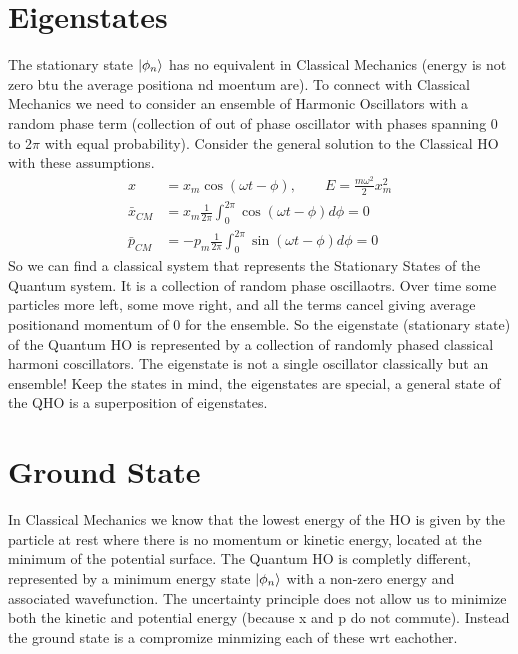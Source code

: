 \documentclass{article}
\newcommand{\be}{\begin{equation}}
\newcommand{\ee}{\end{equation}}
\begin{document}
\section*{Eigenstates}
The stationary state $\ket{\phi_n}$ has no equivalent in Classical Mechanics (energy is not zero btu the average positiona nd moentum are). 
To connect with Classical Mechanics we need to consider an ensemble of Harmonic Oscillators with a random phase term (collection of out of phase oscillator with phases spanning 0 to 2$\pi$ with equal  probability).
Consider the general solution to the Classical HO with these assumptions. 
\be
\begin{split}
    x &= x_m \cos(\omega t - \phi), \qquad E = \frac{m\omega^2}{2}x_m^2\\
    \bar{x}_{CM} &= x_m\frac{1}{2\pi}\int_0^{2\pi} \cos(\omega t - \phi) d\phi = 0\\
    \bar{p}_{CM} &= -p_m\frac{1}{2\pi}\int_0^{2\pi} \sin(\omega t - \phi) d\phi = 0
\end{split}
\ee
So we can find a classical system that represents the Stationary States of the Quantum system.
It is a collection of random phase oscillaotrs.
Over time some particles more left, some move right, and all the terms cancel giving average positionand momentum of 0 for the ensemble. 
So the eigenstate (stationary state) of the Quantum HO is represented by a collection of randomly phased classical harmoni coscillators. 
The eigenstate is not a single oscillator classically but an ensemble!
Keep the states in mind, the eigenstates are special, a general state of the QHO is a superposition of eigenstates.

\section*{Ground State}
In Classical Mechanics we know  that the lowest energy of the HO is given by the particle at rest where there is no  momentum or kinetic energy, located at the minimum of the potential surface. 
The Quantum HO is completly different, represented by a minimum energy state $\ket{\phi_n}$  with a non-zero energy and associated wavefunction. 
The uncertainty principle does not allow us to minimize both the kinetic and potential energy (because x and p do not commute). 
Instead the ground state is a compromize minmizing each of these wrt eachother. 
\end{document}
